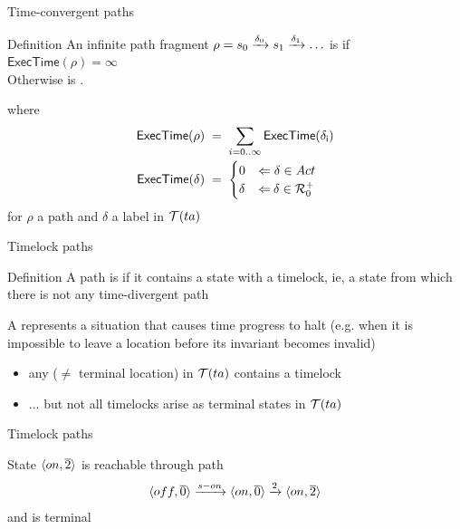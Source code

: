 \documentclass[aspectratio=169]{beamer}
\begin{document}
\def\ET#1{\mathsf{ExecTime(#1)}}
\begin{slide}{Time-convergent paths}
\small

\begin{block}{Definition}
An infinite path fragment $\rho = s_0 \xrightarrow{\delta_0} s_1 \xrightarrow{\delta_1} \ldots$ is  if $\ET{\rho} = \infty$\\
Otherwise is  . 
\end{block}

where
\begin{align*}
\ET{\rho}\; & =\; \sum_{i=0 .. \infty} \ET{\delta_i}\\
\ET{\delta}\; & =\; \begin{cases}
0 & \rimp\;  \delta \in Act\\
\delta & \rimp\:  \delta \in \R_0^+
\end{cases}
\end{align*}
for $\rho$ a path and $\delta$ a label in $\mathcal{T}(ta)$ 
\end{slide}

\begin{slide}{Timelock paths}
\small

\begin{block}{Definition}
A path is  if it contains a state with a timelock, ie, a \alert{state
from which there is not any time-divergent path}
\vspace{0.3cm}

A  represents a situation that causes time progress to halt (e.g. when it is impossible to leave a location before its invariant becomes invalid)
\end{block}

\begin{itemize}
\item any  ($\neq$ terminal location) in $\mathcal{T}(ta)$ contains a timelock
\item ... but not all timelocks arise as terminal states in $\mathcal{T}(ta)$
\end{itemize}
\end{slide}



\begin{slide}{Timelock paths}
\small

\begin{center}
\end{center}

State $\langle on,\overline{2} \rangle$ \pause is reachable through path 
$$\langle off,\overline{0} \rangle \xrightarrow{s-on} \langle on,\overline{0} \rangle \xrightarrow{2} \langle on,\overline{2} \rangle$$
and is terminal

\end{slide}
\end{document}
